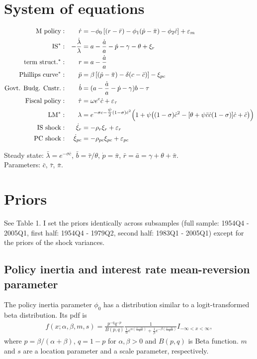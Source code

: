 \documentclass[12pt,reqno,oneside]{amsart}
\theoremstyle{definition}
\theoremstyle{remark}
\newcommand{\eps}{\varepsilon}
\begin{document}
\section{System of equations}

\begin{align}
\text{M policy}             &:& \dot r &= -\phi_0 \left[(r - \bar r ) - \phi_1 (\dot p - \bar\pi ) - \phi_2 \dot c \right]+ \eps_{m} \\
\text{IS}^\ast              &:& -\frac{\dot\lambda}{\lambda} &= a - \frac{\dot a}{a} - \dot p - \gamma - \theta + \xi_r \\
\text{term struct.}^\ast    &:& r &= a - \frac{\dot a}{a} \\
\text{Phillips curve}^\ast  &:& \ddot p &= \beta \left[ (\dot p - \bar\pi ) - \delta (c - \bar c )\right] - \xi_{pc} \\
\text{Govt. Budg. Cnstr.}   &:& \dot b &=  (a - \frac{\dot a}{a} -\dot p -\gamma) b - \tau \\
\text{Fiscal policy}        &:& \dot \tau &= \omega e^c \dot c + \eps_\tau \\
\text{LM}^\ast              &:& \lambda &= e^{-\sigma c-\tfrac{\psi}{2}(1-\sigma)\dot c^2}\Bigl(1+\psi\bigl((1-\sigma)\dot c^2 -[\theta+\psi\ddot c\dot c(1-\sigma)] \dot c + \ddot c \bigr)\Bigr) \\
\text{IS shock}             &:& \dot\xi_r &= -\rho_r\xi_r + \eps_r \\
\text{PC shock}             &:& \dot\xi_{pc} &= -\rho_{pc}\xi_{pc} + \eps_{pc}
\end{align}

Steady state: $\bar\lambda = e^{-\sigma \bar c}$, $\bar b = \bar\tau / \theta$, $\dot p = \bar\pi$, $\bar r = \bar a = \gamma + \theta + \bar\pi$. \\
Parameters: $\bar c$, $\bar \tau$, $\bar\pi$.

\section{Priors}

See Table 1. I set the priors identically across subsamples (full sample: 1954Q4 - 2005Q1, first half: 1954Q4 - 1979Q2, second half: 1983Q1 - 2005Q1) except for the priors of the shock variances.

\subsection{Policy inertia and interest rate mean-reversion parameter}
The policy inertia parameter $\phi_{0}$ has a distribution similar to a logit-transformed beta distribution. Its pdf is
\begin{gather}
  f(x;\alpha,\beta,m,s) = \frac{p^{-q}q^{-p}}{B(p,q)}\frac{1}{\frac{1}{\alpha}e^{\alpha \left(\frac{x-m}{s}\right)}+\frac{1}{\beta}e^{-\beta \left(\frac{x-m}{s}\right)}}I_{-\infty < x < \infty},
\end{gather}
where $p=\beta/(\alpha+\beta)$, $q=1-p$ for $\alpha, \beta > 0$ and $B(p,q)$ is Beta function. $m$ and $s$ are a location parameter and a scale parameter, respectively.
\end{document}
